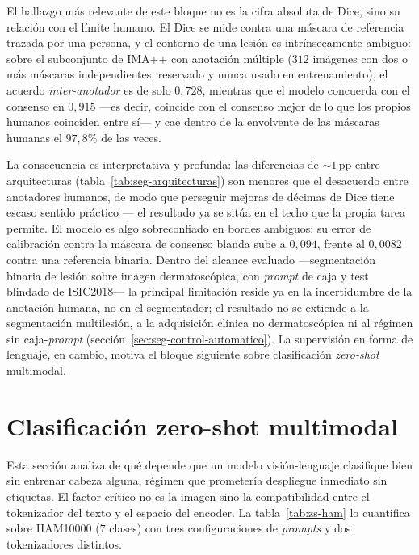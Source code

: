 El hallazgo más relevante de este bloque no es la cifra absoluta de
Dice, sino su relación con el límite humano. El Dice se mide contra
una máscara de referencia trazada por una persona, y el contorno de
una lesión es intrínsecamente ambiguo: sobre el subconjunto de IMA++
con anotación múltiple ($312$ imágenes con dos o más máscaras
independientes, reservado y nunca usado en entrenamiento), el acuerdo
\emph{inter-anotador} es de solo $0{,}728$, mientras que el modelo
concuerda con el consenso en $0{,}915$ ---es decir, coincide con el
consenso mejor de lo que los propios humanos coinciden entre sí--- y
cae dentro de la envolvente de las máscaras humanas el $97{,}8\%$ de
las veces.

La consecuencia es interpretativa y profunda: las diferencias de
$\sim 1$\,pp entre arquitecturas (tabla~\ref{tab:seg-arquitecturas})
son menores que el desacuerdo entre anotadores humanos, de modo que
perseguir mejoras de décimas de Dice tiene escaso sentido práctico ---
el resultado ya se sitúa en el techo que la propia tarea permite. El modelo es
algo sobreconfiado en bordes ambiguos: su error de calibración contra
la máscara de consenso blanda sube a $0{,}094$, frente al $0{,}0082$
contra una referencia binaria. Dentro del alcance evaluado
---segmentación binaria de lesión sobre imagen dermatoscópica, con
\emph{prompt} de caja y test blindado de ISIC2018--- la principal
limitación reside ya en la incertidumbre de la anotación humana, no en
el segmentador; el resultado no se extiende a la segmentación
multilesión, a la adquisición clínica no dermatoscópica ni al régimen
sin caja-\emph{prompt} (sección~\ref{sec:seg-control-automatico}). La
supervisión en forma de lenguaje, en cambio, motiva el bloque
siguiente sobre clasificación \emph{zero-shot} multimodal.

\section{Clasificación zero-shot multimodal}
\label{sec:zs-results}

Esta sección analiza de qué depende que un modelo visión-lenguaje
clasifique bien sin entrenar cabeza alguna, régimen que prometería
despliegue inmediato sin etiquetas. El factor crítico no es la imagen
sino la compatibilidad entre el tokenizador del texto y el espacio del
encoder. La tabla~\ref{tab:zs-ham} lo cuantifica sobre HAM10000
($7$ clases) con tres configuraciones de \emph{prompts} y dos
tokenizadores distintos.

